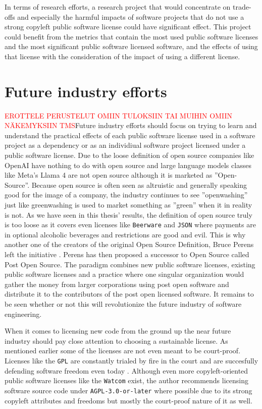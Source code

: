 In terms of research efforts, a research project that would concentrate on trade-offs and especially the harmful impacts of software projects that do not use a strong copyleft public software license could have significant effect. This project could benefit from the metrics that contain the most used public software licenses and the most significant public software licensed software, and the effects of using that license with the consideration of the impact of using a different license. 

\section{Future industry efforts}
\textcolor{red}{EROTTELE PERUSTELUT OMIIN TULOKSIIN TAI MUIHIN OMIIN NÄKEMYKSIIN TMS}Future industry efforts should focus on trying to learn and understand the practical effects of each public software license used in a software project as a dependency or as an individiual software project licensed under a public software license. Due to the loose definition of open source companies like OpenAI have nothing to do with open source and large language models classes like Meta's Llama 4 are not open source although it is marketed as ''Open-Source''. Because open source is often seen as altruistic and generally speaking good for the image of a company, the industry continues to see ''openwashing'' just like greenwashing is used to market something as ''green'' when it in reality is not. As we have seen in this thesis' results, the definition of open source truly is too loose as it covers even licenses like \texttt{Beerware} and \texttt{JSON} where payments are in optional alcoholic beverages and restrictions are good and evil. This is why another one of the creators of the original Open Source Definition, Bruce Perens left the initiative \citep{register:perens-left-osi}.  Perens has then proposed a successor to Open Source called Post Open Source. The paradigm combines new public software licenses, existing public software licenses and a practice where one singular organization would gather the money from larger corporations using post open software and distribute it to the contributors of the post open licensed software. It remains to be seen whether or not this will revolutionize the future industry of software engineering. 

When it comes to licensing new code from the ground up the near future industry should pay close attention to choosing a sustainable license. As mentioned earlier some of the licenses are not even meant to be court-proof. Licenses like the \texttt{GPL} are constantly trialed by fire in the court and are succesfully defending software freedom even today \citep{gplv2-court}. Although even more copyleft-oriented public software licenses like the \texttt{Watcom} exist, the author recommends licensing software source code under \texttt{AGPL-3.0-or-later} where possible due to its strong copyleft attributes and freedoms but mostly the court-proof nature of it as well.


